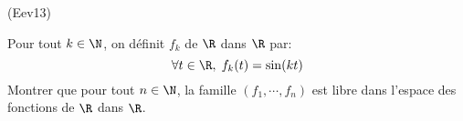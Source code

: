\begin{tiny}(Eev13)\end{tiny} Pour tout $k\in \N$, on définit $f_k$ de $\R$ dans $\R$ par:
\begin{displaymath}
  \forall t\in \R, \; f_k(t) = \sin(kt)
\end{displaymath}
Montrer que pour tout $n\in \N$, la famille $\left(f_1,\cdots,f_n \right)$ est libre dans l'espace des fonctions de $\R$ dans $\R$. 
